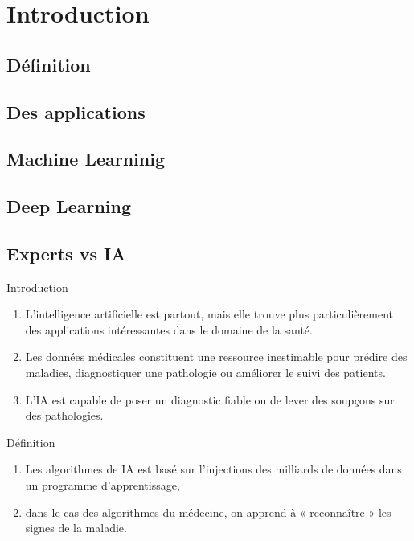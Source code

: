 \section{Introduction}
\subsection{Définition}
\subsection{Des applications}
\subsection{Machine Learninig}
\subsection{Deep Learning}
\subsection{Experts  vs IA}


\begin{frame}{Introduction}
    \begin{enumerate}[<+-|alert@+>][$\blacksquare$]
        \item
        L'intelligence artificielle est partout, mais elle trouve plus particulièrement
        des applications intéressantes dans le domaine de la santé.

        \item
        Les données médicales constituent une ressource inestimable pour prédire des maladies,
        diagnostiquer une pathologie ou améliorer le suivi des patients.

        \item
        L'IA est capable de poser un diagnostic fiable ou de lever des soupçons sur des
        pathologies.
    \end{enumerate}
\end{frame}




\begin{frame}{Définition}
    \begin{enumerate}[<+-|alert@+>][$\blacksquare$]
        \item
        Les algorithmes de IA est basé sur  l'injections des milliards de données
        dans un programme d'apprentissage,

        \item
        dans le cas des algorithmes du médecine, on apprend à « reconnaître » les signes
        de la maladie.
    \end{enumerate}
\end{frame}

